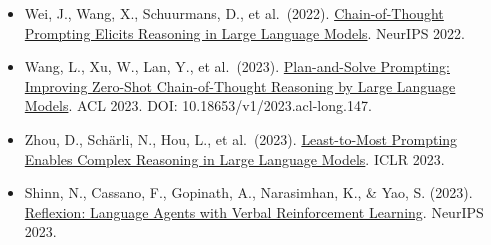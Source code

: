 \vspace{0.25em}
\begin{itemize}
\tightlist
\item
  Wei, J., Wang, X., Schuurmans, D., et al.~(2022). \href{https://arxiv.org/abs/2201.11903}{Chain-of-Thought Prompting Elicits Reasoning in Large Language Models}. NeurIPS 2022.
\item
  Wang, L., Xu, W., Lan, Y., et al.~(2023). \href{https://aclanthology.org/2023.acl-long.147/}{Plan-and-Solve Prompting: Improving Zero-Shot Chain-of-Thought Reasoning by Large Language Models}. ACL 2023. DOI: 10.18653/v1/2023.acl-long.147.
\item
  Zhou, D., Schärli, N., Hou, L., et al.~(2023). \href{https://openreview.net/forum?id=WZH7099tgfM}{Least-to-Most Prompting Enables Complex Reasoning in Large Language Models}. ICLR 2023.
\item
  Shinn, N., Cassano, F., Gopinath, A., Narasimhan, K., \& Yao, S. (2023). \href{https://arxiv.org/abs/2303.11366}{Reflexion: Language Agents with Verbal Reinforcement Learning}. NeurIPS 2023.
\end{itemize}

\clearpage
